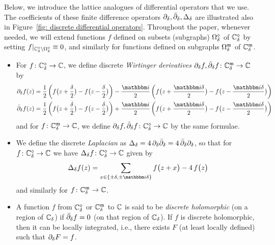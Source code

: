 \documentclass[12pt,oneside,english]{amsart}
\numberwithin{equation}{section}
\numberwithin{figure}{section}
\theoremstyle{plain}
\theoremstyle{plain}
\theoremstyle{plain}
\theoremstyle{plain}
\theoremstyle{remark}
\theoremstyle{definition}
\theoremstyle{plain}
\theoremstyle{plain}
\numberwithin{thm}{section}
\newcommand{\kallemod}[1]{{\color{kallecol} {#1}}}
\begin{document}
Below, we introduce the
lattice analogues of differential
operators that we use. The coefficients of these finite difference operators 
${\partial}_{{\delta}}, {{\bar{\partial}}}_{{\delta}}, {\Delta}_{{\delta}}$ are illustrated also in 
Figure~\ref{fig: discrete differential operators}.
Throughout the paper, whenever needed, we will extend functions
$f$ defined on subsets (subgraphs) ${{\Omega}}_{{\delta}}^{\diamond}$
of ${\mathbb{C}_{{\delta}}^{\diamond}}$ by setting 
$f|_{{\mathbb{C}_{{\delta}}^{\diamond}}\setminus{{\Omega}}_{{\delta}}^{\diamond} }\equiv0$,
and similarly for functions defined on subgraphs ${{\Omega}}_{{\delta}}^{\mathfrak{m}}$
of ${\mathbb{C}_{{\delta}}^{\mathfrak{m}}}$.
\begin{itemize}
\item For $f \colon {\mathbb{C}_{{\delta}}^{\diamond}} \to  \mathbb{C} $, we define
discrete \emph{Wirtinger derivatives} 
${\partial}_{{\delta}}  f, {{\bar{\partial}}}_{{\delta}} f \colon {\mathbb{C}_{{\delta}}^{\mathfrak{m}}} \to  \mathbb{C} $
by 
\begin{align*}
\ddee f(z)  & 
= \frac{1}{2} \left(
      f \big( z+\frac{\meshsz}{2} \big)
      - f\big( z-\frac{\meshsz}{2} \big) \right)
  - \frac{\ii}{2} \left(
      f \big( z+\frac{\ii \meshsz}{2} \big)
      - f \big( z-\frac {\ii \meshsz}{2} \big) \right) \\
 \ddeebar f(z)  & 
= \frac{1}{2} \left(
      f \big( z+\frac{\meshsz}{2} \big)
      - f\big( z-\frac{\meshsz}{2} \big) \right)
  + \frac{\ii}{2} \left(
      f \big( z+\frac{\ii \meshsz}{2} \big)
      - f \big( z-\frac {\ii \meshsz}{2} \big) \right) 
\end{align*}
and for $f \colon {\mathbb{C}_{{\delta}}^{\mathfrak{m}}} \to  \mathbb{C} $, we define 
${\partial}_{{\delta}} f,{{\bar{\partial}}}_{{\delta}} f \colon {\mathbb{C}_{{\delta}}^{\diamond}}  \to  \mathbb{C} $
by the same formulae.
\item We define
the discrete \emph{Laplacian} as
${\Delta}_{{\delta}} = 4 \, {\partial}_{{\delta}} {{\bar{\partial}}}_{{\delta}} = 4 \, {{\bar{\partial}}}_{{\delta}} {\partial}_{{\delta}}$, so that
for $f \colon {\mathbb{C}_{{\delta}}^{\diamond}} \to \mathbb{C}$
we have ${ {\Delta}_{{\delta}} f \colon {\mathbb{C}_{{\delta}}^{\diamond}} \to \mathbb{C}}$ given by
\begin{align*}
\dLapl f (z) =
    \sum_{x \in \set{ \pm \meshsz , \pm \ii \meshsz}} f \big( z+x \big)
    -4 \, f \big( z \big)
\end{align*}
and similarly for $f \colon {\mathbb{C}_{{\delta}}^{\mathfrak{m}}} \to  \mathbb{C} $.
\item {A function $f$ from ${\mathbb{C}_{{\delta}}^{\diamond}}$ or 
${\mathbb{C}_{{\delta}}^{\mathfrak{m}}}$
to $ \mathbb{C} $ is said to be \emph{discrete holomorphic} (on a region
of ${\mathbb{C}_{{\delta}}}$) if ${{\bar{\partial}}}_{{\delta}} f=0$ (on that
region of ${\mathbb{C}_{{\delta}}}$). If $f$ is discrete holomorphic,
then it can be locally integrated, i.e., there exists $F$ (at least
locally defined) such that ${\partial}_{{\delta}} F=f$. } 
\end{itemize}
\end{document}
